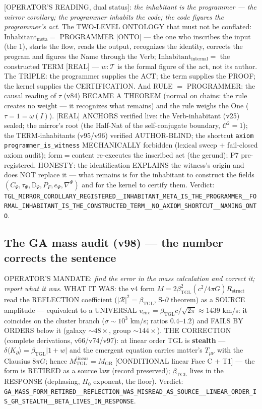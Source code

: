 \documentclass[11pt]{article}
\newcommand{\bTGL}{\beta_{\mathrm{TGL}}}\newcommand{\Msun}{M_{\odot}}\newcommand{\TGL}{\mathrm{TGL}}
\theoremstyle{definition}\newtheorem{deriv}{Derivation}
\begin{document}
[OPERATOR'S READING, dual status]: \emph{the inhabitant is the programmer --- the mirror corollary; the programmer inhabits the code; the code figures the programmer's act}. The TWO-LEVEL ONTOLOGY that must not be conflated: $\mathrm{Inhabitant}_{\mathrm{meta}}=$ PROGRAMMER [ONTO] --- the one who inscribes the input (the 1), starts the flow, reads the output, recognizes the identity, corrects the program and figures the Name through the Verb; $\mathrm{Inhabitant}_{\mathrm{internal}}=$ the constructed TERM [REAL] --- $w:\mathcal T$ is the formal figure of the act, not its author. The TRIPLE: the programmer supplies the ACT; the term supplies the PROOF; the kernel supplies the CERTIFICATION. And RULE $=$ PROGRAMMER: the causal reading of $\tau$ (v84) BECAME A THEOREM (normal on chains: the rule creates no weight --- it recognizes what remains) and the rule weighs the One ($\tau=1=\omega(I)$). [REAL] ANCHORS verified live: the Verb-inhabitant (v25) sealed; the mirror's root (the Half-Nat of the self-conjugate boundary, $\mathcal C^2=1$); the TERM-inhabitants (v95/v96) verified AUTHOR-BLIND; the shortcut \texttt{axiom programmer\_is\_witness} MECHANICALLY forbidden (lexical sweep $+$ fail-closed axiom audit); form$=$content re-executes the inscribed act (the gerund); P7 pre-registered. HONESTY: the identification EXPLAINS the witness's origin and does NOT replace it --- what remains is for the inhabitant to construct the fields $(C_\Psi,\tau_\Psi,\mathbb D_\Psi,P_F,e_\Psi,\nabla^\Psi)$ and for the kernel to certify them. Verdict: \texttt{TGL\_MIRROR\_COROLLARY\_REGISTERED\_\_INHABITANT\_META\_IS\_THE\_PROGRAMMER\_\_FORMAL\_INHABITANT\_IS\_THE\_CONSTRUCTED\_TERM\_\_NO\_AXIOM\_SHORTCUT\_\_NAMING\_ONTO}.

\subsection*{The GA mass audit (v98) --- the number corrects the sentence}

OPERATOR'S MANDATE: \emph{find the error in the mass calculation and correct it; report what it was}. WHAT IT WAS: the v4 form $M=2\bTGL^2(c^2/4\pi G)R_{\mathrm{struct}}$ read the REFLECTION coefficient ($|\mathcal R|^2=\bTGL$, S-$\partial$ theorem) as a SOURCE amplitude --- equivalent to a UNIVERSAL $v_{\mathrm{circ}}=\bTGL c/\sqrt{2\pi}\approx1439$ km/s: it coincides on the cluster branch ($\sigma\sim10^3$ km/s; ratios $0.4$--$1.2$) and FAILS BY ORDERS below it (galaxy $\sim48\times$, group $\sim144\times$). THE CORRECTION (complete derivations, v66/v74/v97): at linear order TGL is \textbf{stealth} --- $\delta\langle K_\partial\rangle=\bTGL|1+w|$ and the emergent equation carries matter's $T_{\mu\nu}$ with the Clausius $8\pi G$; hence $M_{\mathrm{TGL}}^{\mathrm{linear}}=M_{\mathrm{GR}}$ [CONDITIONAL linear Face C $+$ T1] --- the form is RETIRED as a source law (record preserved); $\bTGL$ lives in the RESPONSE (dephasing, $H_0$ exponent, the floor). Verdict: \texttt{GA\_MASS\_FORM\_RETIRED\_\_REFLECTION\_WAS\_MISREAD\_AS\_SOURCE\_\_LINEAR\_ORDER\_IS\_GR\_STEALTH\_\_BETA\_LIVES\_IN\_RESPONSE}.
\end{document}
